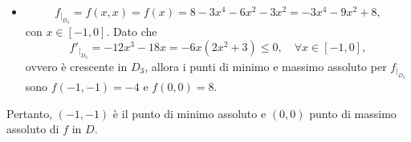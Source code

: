 \begin{example}
\begin{itemize}
		\item [$\boldsymbol{D_3}$] 
		\begin{equation*}
			f_{|_{D_3}}= f(x,x) =f(x)= 8 - 3x^4 - 6x^2 - 3x^2 = -3x^4 - 9x^2 + 8,
		\end{equation*}
		con $x\in[-1,0]$. Dato che
		\begin{equation*}
			f'_{|_{D_3}} = -12x^3 - 18x =  -6x(2x^2 + 3)\leq 0,\quad\forall x\in[-1,0],
		\end{equation*}
		ovvero è crescente in $D_3$, allora i punti di minimo e massimo assoluto per $f_{|_{D_3}}$ sono $f(-1,-1) = -4$ e $f(0,0)=8$.
	\end{itemize}
	Pertanto, $(-1,-1)$ è il punto di minimo assoluto  e $(0,0)$ punto di massimo assoluto di $f$ in $D$. 
\end{example}

